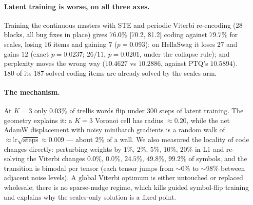 \documentclass[11pt,a4paper]{article}
\begin{document}
\paragraph{Latent training is worse, on all three axes.} Training the continuous masters with
STE and periodic Viterbi re-encoding (28 blocks, all bug fixes in place) gives $76.0\%$
[70.2, 81.2] coding against $79.7\%$ for scales, losing $16$ items and gaining $7$
($p=0.093$); on HellaSwag it loses $27$ and gains $12$ (exact $p=0.0237$; $26/11$, $p=0.0201$, under the collapse rule); and perplexity moves
the wrong way ($10.4627$ vs $10.2886$, against PTQ's $10.5894$). $180$ of its $187$ solved coding
items are already solved by the scales arm.

\paragraph{The mechanism.} At $K=3$ only $\mathbf{0.03\%}$ of trellis words flip under 300 steps
of latent training. The geometry explains it: a $K=3$ Voronoi cell has radius $\approx0.20$,
while the net AdamW displacement with noisy minibatch gradients is a random walk of
$\approx \mathrm{lr}\sqrt{\text{steps}}\approx0.009$ --- about $2\%$ of a wall. We also measured
the locality of code changes directly: perturbing weights by $1\%$, $2\%$, $5\%$, $10\%$, $20\%$
in L1 and re-solving the Viterbi changes $0.0\%$, $0.0\%$, $24.5\%$, $49.8\%$, $99.2\%$ of symbols,
and the transition is bimodal per tensor (each tensor jumps from $\sim$0\% to $\sim$98\% between
adjacent noise levels). A global Viterbi optimum is either untouched or replaced wholesale; there
is no sparse-nudge regime, which kills guided symbol-flip training and explains why the
scales-only solution is a fixed point.
\end{document}
